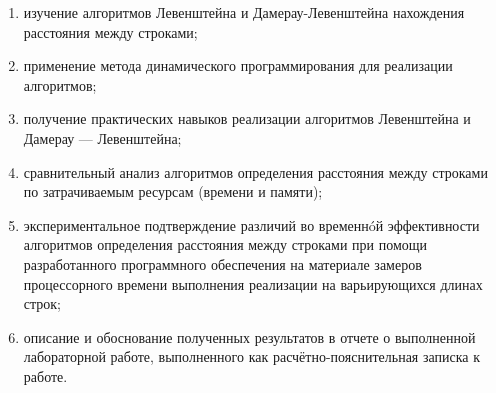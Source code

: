\begin{enumerate}
	\item изучение алгоритмов Левенштейна и Дамерау-Левенштейна нахождения расстояния между строками;
	\item применение метода динамического программирования для реализации алгоритмов;
	\item получение практических навыков реализации алгоритмов Левенштейна и Дамерау — Левенштейна;
	\item сравнительный анализ алгоритмов определения расстояния между строками по затрачиваемым ресурсам (времени и памяти);
	\item экспериментальное подтверждение различий во временнóй эффективности алгоритмов определения расстояния между строками при помощи разработанного программного обеспечения на материале замеров процессорного времени выполнения реализации на варьирующихся длинах строк; 
	\item описание и обоснование полученных результатов в отчете о выполненной лабораторной работе, выполненного как расчётно-пояснительная записка к работе.
\end{enumerate}
